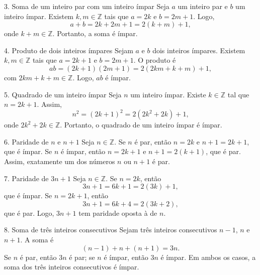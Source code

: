 \documentclass[12pt]{article}
\begin{document}
\begin{block}{3. Soma de um inteiro par com um inteiro ímpar}
Seja $a$ um inteiro par e $b$ um inteiro ímpar. Existem $k,m \in \mathbb{Z}$ tais que
$a = 2k$ e $b = 2m+1$. Logo,
\[
a+b = 2k + 2m + 1 = 2(k+m)+1,
\]
onde $k+m \in \mathbb{Z}$. Portanto, a soma é ímpar.
\end{block}

\begin{block}{4. Produto de dois inteiros ímpares}
Sejam $a$ e $b$ dois inteiros ímpares. Existem $k,m \in \mathbb{Z}$ tais que
$a = 2k+1$ e $b = 2m+1$. O produto é
\[
ab = (2k+1)(2m+1) = 2(2km+k+m)+1,
\]
com $2km+k+m \in \mathbb{Z}$. Logo, $ab$ é ímpar.
\end{block}

\begin{block}{5. Quadrado de um inteiro ímpar}
Seja $n$ um inteiro ímpar. Existe $k \in \mathbb{Z}$ tal que $n = 2k+1$. Assim,
\[
n^2 = (2k+1)^2 = 2(2k^2+2k)+1,
\]
onde $2k^2+2k \in \mathbb{Z}$. Portanto, o quadrado de um inteiro ímpar é ímpar.
\end{block}

\begin{block}{6. Paridade de $n$ e $n+1$}
Seja $n \in \mathbb{Z}$. Se $n$ é par, então $n=2k$ e $n+1=2k+1$, que é ímpar.
Se $n$ é ímpar, então $n=2k+1$ e $n+1=2(k+1)$, que é par.
Assim, exatamente um dos números $n$ ou $n+1$ é par.
\end{block}

\begin{block}{7. Paridade de $3n+1$}
Seja $n \in \mathbb{Z}$. Se $n=2k$, então
\[
3n+1 = 6k+1 = 2(3k)+1,
\]
que é ímpar. Se $n=2k+1$, então
\[
3n+1 = 6k+4 = 2(3k+2),
\]
que é par. Logo, $3n+1$ tem paridade oposta à de $n$.
\end{block}

\begin{block}{8. Soma de três inteiros consecutivos}
Sejam três inteiros consecutivos $n-1$, $n$ e $n+1$. A soma é
\[
(n-1)+n+(n+1)=3n.
\]
Se $n$ é par, então $3n$ é par; se $n$ é ímpar, então $3n$ é ímpar.
Em ambos os casos, a soma dos três inteiros consecutivos é ímpar.
\end{block}
\end{document}
